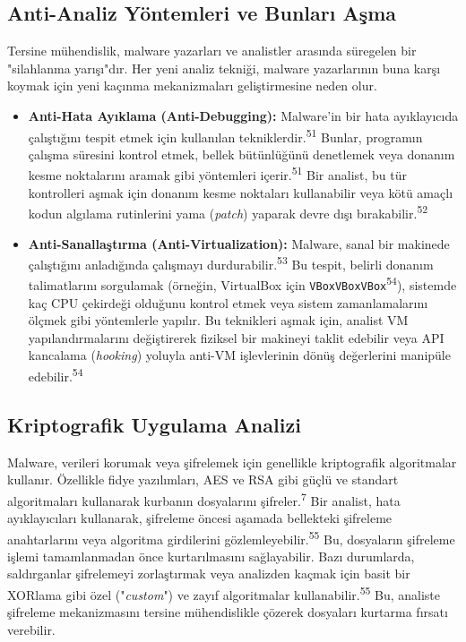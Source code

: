 \subsection{Anti-Analiz Yöntemleri ve Bunları Aşma}

Tersine mühendislik, malware yazarları ve analistler arasında süregelen bir "silahlanma yarışı"dır. Her yeni analiz tekniği, malware yazarlarının buna karşı koymak için yeni kaçınma mekanizmaları geliştirmesine neden olur.

\begin{itemize}
    \item \textbf{Anti-Hata Ayıklama (Anti-Debugging):} Malware'in bir hata ayıklayıcıda çalıştığını tespit etmek için kullanılan tekniklerdir.\textsuperscript{51} Bunlar, programın çalışma süresini kontrol etmek, bellek bütünlüğünü denetlemek veya donanım kesme noktalarını aramak gibi yöntemleri içerir.\textsuperscript{51} Bir analist, bu tür kontrolleri aşmak için donanım kesme noktaları kullanabilir veya kötü amaçlı kodun algılama rutinlerini yama (\textit{patch}) yaparak devre dışı bırakabilir.\textsuperscript{52}
    \item \textbf{Anti-Sanallaştırma (Anti-Virtualization):} Malware, sanal bir makinede çalıştığını anladığında çalışmayı durdurabilir.\textsuperscript{53} Bu tespit, belirli donanım talimatlarını sorgulamak (örneğin, VirtualBox için \texttt{VBoxVBoxVBox}\textsuperscript{54}), sistemde kaç CPU çekirdeği olduğunu kontrol etmek veya sistem zamanlamalarını ölçmek gibi yöntemlerle yapılır. Bu teknikleri aşmak için, analist VM yapılandırmalarını değiştirerek fiziksel bir makineyi taklit edebilir veya API kancalama (\textit{hooking}) yoluyla anti-VM işlevlerinin dönüş değerlerini manipüle edebilir.\textsuperscript{54}
\end{itemize}

\subsection{Kriptografik Uygulama Analizi}

Malware, verileri korumak veya şifrelemek için genellikle kriptografik algoritmalar kullanır. Özellikle fidye yazılımları, AES ve RSA gibi güçlü ve standart algoritmaları kullanarak kurbanın dosyalarını şifreler.\textsuperscript{7} Bir analist, hata ayıklayıcıları kullanarak, şifreleme öncesi aşamada bellekteki şifreleme anahtarlarını veya algoritma girdilerini gözlemleyebilir.\textsuperscript{55} Bu, dosyaların şifreleme işlemi tamamlanmadan önce kurtarılmasını sağlayabilir. Bazı durumlarda, saldırganlar şifrelemeyi zorlaştırmak veya analizden kaçmak için basit bir XORlama gibi özel ("\textit{custom}") ve zayıf algoritmalar kullanabilir.\textsuperscript{55} Bu, analiste şifreleme mekanizmasını tersine mühendislikle çözerek dosyaları kurtarma fırsatı verebilir.

